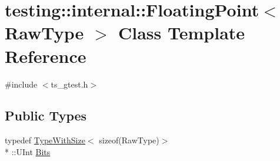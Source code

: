 \hypertarget{classtesting_1_1internal_1_1FloatingPoint}{\section{testing\-:\-:internal\-:\-:Floating\-Point$<$ Raw\-Type $>$ Class Template Reference}
\label{classtesting_1_1internal_1_1FloatingPoint}
}


{\ttfamily \#include $<$ts\-\_\-gtest.\-h$>$}

\subsection*{Public Types}
\begin{DoxyCompactItemize}
\item 
typedef \hyperlink{classtesting_1_1internal_1_1TypeWithSize}{Type\-With\-Size}$<$ sizeof(Raw\-Type)$>$\\*
\-::U\-Int \hyperlink{classtesting_1_1internal_1_1FloatingPoint_abf228bf6cd48f12c8b44c85b4971a731}{Bits}
\end{DoxyCompactItemize}
